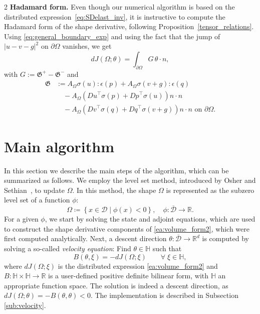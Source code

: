 \documentclass[a4paper, oneside]{article}
\newcommand{\Om}{\Omega}
\newcommand{\VV}{\theta}
\newcommand{\R}{\mathds{R}}
\begin{document}
\begin{multicols}{2}
\textbf{Hadamard form.} Even though our numerical algorithm is based on the distributed expression~\eqref{eq:SDelast_inv}, it is instructive to compute the Hadamard form of the shape derivative, following Proposition~\ref{tensor_relations}.
Using \eqref{eq:general_boundary_exp} and using the fact that the jump of $|u-v-g|^2$ on $\partial\Om$ vanishes, we get
\begin{equation}
	dJ(\Omega;\theta) = \int_{\partial \Omega} G\, \theta\cdot n,
	\end{equation}
	with
	$G :=  \mathfrak{G}^+- \mathfrak{G}^-$ and 
\begin{align*}
	\mathfrak{G} & := A_{\Omega}\sigma(u):\epsilon(p) + A_{\Omega}\sigma(v+g):\epsilon(q)\\
			  & \quad - A_{\Omega} \left({Du}^{\top}\sigma(p) + {Dp}^{\top}\sigma(u)\right)n\cdot n\\
			  & \quad - A_{\Omega} \left({Dv}^{\top}\sigma(q) + {Dq}^{\top}\sigma(v+g)\right)n\cdot n \text{ on }\partial\Om.
\end{align*}


\section{Main algorithm}\label{sec:algo}


In this section we describe the main steps of the algorithm, which can be summarized as follows. 
We employ the level set method, introduced by Osher and Sethian~\cite{MR965860}, to update $\Om$. 
In this method, the shape $\Om$ is represented as the subzero level set of a function $\phi$:
\begin{equation} \label{eq:subdomain}
	\Omega \coloneqq \left\{x\in\mathcal{D}\mid \phi(x)<0\right\},
	\quad
	\phi:\overline{\mathcal{D}} \rightarrow \mathds{R}.
\end{equation}
For a given $\phi$, we start by solving the state and adjoint equations, which are used  to construct the shape derivative components of  \eqref{ea:volume_form2}, which were first computed analytically.
Next, a descent direction $\VV: \overline{\mathcal{D}}\to\R^d$ is computed by solving a so-called {\it velocity equation}:
Find $\theta\in\mathbb{H}$ such that
\begin{equation}\label{eq:velocity_eq0} 
	B(\theta, \xi) = - dJ(\Omega ;\xi)\qquad \forall \; \xi \in \mathbb{H},
\end{equation}	
where $dJ(\Omega ;\xi)$ is the distributed expression \eqref{ea:volume_form2} and $B:\mathbb{H}\times \mathbb{H} \rightarrow \mathds{R}$ is a user-defined positive definite bilinear form, with $\mathbb{H}$ an appropriate function space.
The solution is indeed a descent direction, as  $dJ(\Omega ;\VV) = - B(\VV,\VV)<0
$.
The implementation is described in Subsection \ref{sub:velocity}.


\end{multicols}
\end{document}
